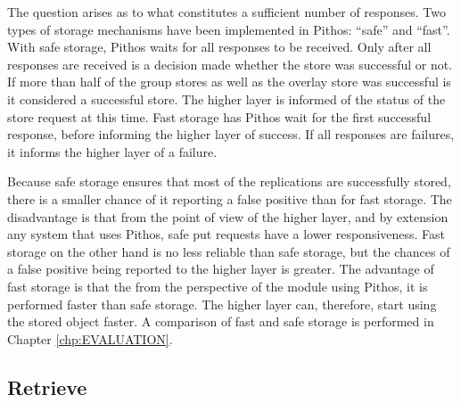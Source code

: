 The question arises as to what constitutes a sufficient number of responses. Two types of storage mechanisms have been implemented in Pithos: ``safe'' and ``fast''. With safe storage, Pithos waits for all responses to be received. Only after all responses are received is a decision made whether the store was successful or not. If more than half of the group stores as well as the overlay store was successful is it considered a successful store. The higher layer is informed of the status of the store request at this time. Fast storage has Pithos wait for the first successful response, before informing the higher layer of success. If all responses are failures, it informs the higher layer of a failure.

Because safe storage ensures that most of the replications are successfully stored, there is a smaller chance of it reporting a false positive than for fast storage. The disadvantage is that from the point of view of the higher layer, and by extension any system that uses Pithos, safe put requests have a lower responsiveness. Fast storage on the other hand is no less reliable than safe storage, but the chances of a false positive being reported to the higher layer is greater. The advantage of fast storage is that the from the perspective of the module using Pithos, it is performed faster than safe storage. The higher layer can, therefore, start using the stored object faster. A comparison of fast and safe storage is performed in Chapter \ref{chp:EVALUATION}.

\subsection{Retrieve}
\label{pithos_retrieve}


